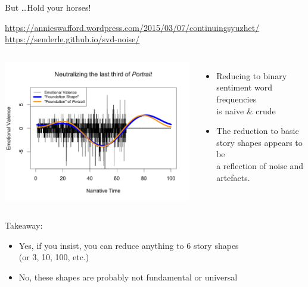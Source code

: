 \documentclass[aspectratio=169,usenames,dvipsnames]{beamer}
\begin{document}
\begin{frame}{But \dots Hold your horses!}
    \begin{reference}
        \url{https://annieswafford.wordpress.com/2015/03/07/continuingsyuzhet/} \\
        \url{https://senderle.github.io/svd-noise/}
    \end{reference}

    \begin{columns}
            \includegraphics[width=0.9\linewidth]{fig/joycenoise}
    \begin{itemize}
        \item Reducing  to binary sentiment word frequencies \\
            is naive \& crude
        \item The reduction to basic story shapes appears to be \\
            a reflection of noise and artefacts.
    \end{itemize}
    \end{columns}

    \pause
    Takeaway:
    \begin{itemize}
        \item Yes, if you insist, you can reduce anything to 6 story shapes \\
            (or 3, 10, 100, etc.)
        \item No, these shapes are probably not fundamental or universal
    \end{itemize}
\end{frame}
\end{document}
